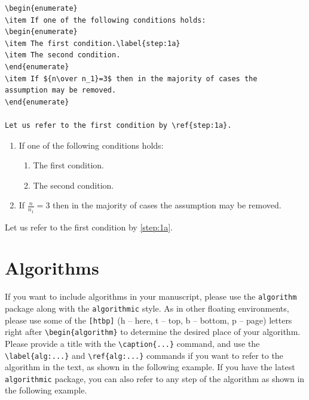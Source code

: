 \documentclass[withtitlethanks]{actacyb}
\begin{document}
\begin{verbatim}
\begin{enumerate}
\item If one of the following conditions holds:
\begin{enumerate}
\item The first condition.\label{step:1a}
\item The second condition.
\end{enumerate}
\item If ${n\over n_1}=3$ then in the majority of cases the 
assumption may be removed.
\end{enumerate}

Let us refer to the first condition by \ref{step:1a}.
\end{verbatim}

\begin{enumerate}
\item If one of the following conditions holds:
\begin{enumerate}
\item The first condition.\label{step:1a}
\item The second condition.
\end{enumerate}
\item If ${\frac{n}{n_1}}=3$ then in the majority of cases the 
assumption may be removed.
\end{enumerate}

Let us refer to the first condition by \ref{step:1a}.


\section{Algorithms}

If you want to include algorithms in your manuscript, please use the \verb|algorithm| package along with the \verb|algorithmic| style.
As in other floating environments, please use some of the \verb|[htbp]| (h -- here, t -- top, b -- bottom, p -- page) letters right after \verb|\begin{algorithm}| to determine the desired place of your algorithm. Please provide a title with the \verb|\caption{...}| command, and use the \verb|\label{alg:...}| and \verb|\ref{alg:...}| commands if you want to refer to the algorithm in the text, as shown in the following example.
If you have the latest \verb|algorithmic| package, you can also refer to any step of the algorithm as shown in the following example.
\end{document}
